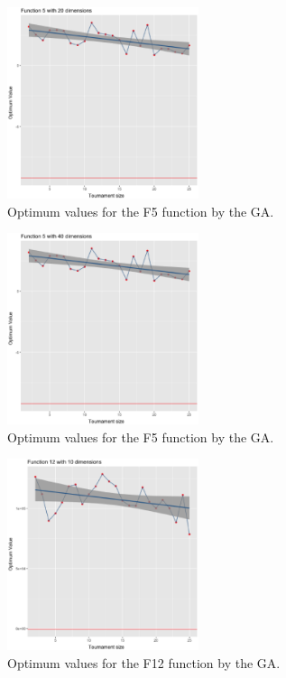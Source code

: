 \begin{figure}[H]
	\includegraphics[width=0.5\textwidth]{img/5dim_20.ps}
	\caption{Optimum values for the F5 function by the GA.}
	\label{5dim_20}
\end{figure}

\begin{figure}[H]
	\includegraphics[width=0.5\textwidth]{img/5dim_40.ps}
	\caption{Optimum values for the F5 function by the GA.}
	\label{5dim_40}
\end{figure}

\begin{figure}[H]
	\includegraphics[width=0.5\textwidth]{img/12dim_10.ps}
	\caption{Optimum values for the F12 function by the GA.}
	\label{12dim_10}
\end{figure}

